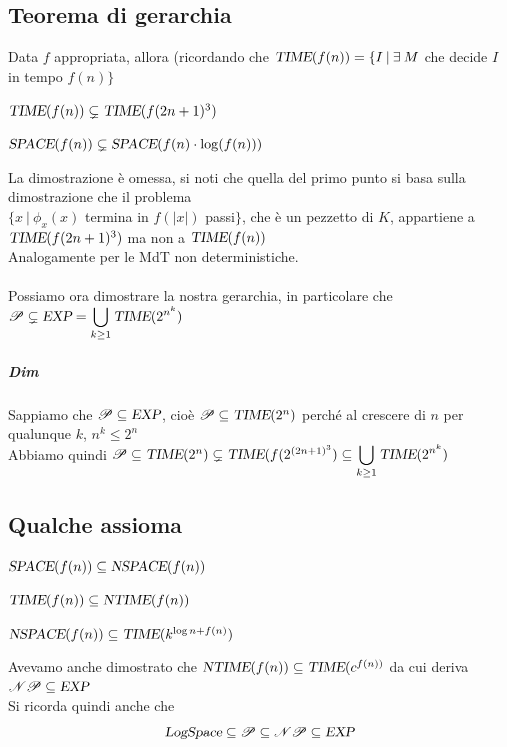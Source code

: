 \documentclass[10pt]{book}
\begin{document}
\subsection{Teorema di gerarchia}
Data $f$ appropriata, allora (ricordando che $\textsl{TIME}(f(n))=\{I\:|\:\exists\:M$ che decide $I$ in tempo $f(n)\}$
\begin{list}{}{}
	\item $\textsl{TIME}(f(n))\subsetneq\textsl{TIME}(f(2n + 1)^3)$
	\item $\textsl{SPACE}(f(n))\subsetneq\textsl{SPACE}(f(n)\cdot\log(f(n)))$
\end{list}
La dimostrazione è omessa, si noti che quella del primo punto si basa sulla dimostrazione che il problema\\$\{x\:|\:\phi_x(x)$ termina in $f(|x|)$ passi$\}$, che è un pezzetto di $K$, appartiene a $\textsl{TIME}(f(2n+1)^3)$ ma non a $\textsl{TIME}(f(n))$\\
Analogamente per le MdT non deterministiche.
\paragraph{} Possiamo ora dimostrare la nostra gerarchia, in particolare che $\mathscr{P} \subsetneq \textsl{EXP} = \mathlarger{\bigcup_{k \geq 1}\textsl{TIME}(2^{n^k})}$
\subparagraph{Dim} Sappiamo che $\mathscr{P} \subseteq \textsl{EXP}$, cioè $\mathscr{P} \subseteq \textsl{TIME}(2^n)$ perché al crescere di $n$ per qualunque $k$, $n^k \leq 2^n$\\
Abbiamo quindi $\mathscr{P} \subseteq \textsl{TIME}(2^n) \subsetneq\textsl{TIME}(f(2^{(2n + 1)^3}) \subseteq \mathlarger{\bigcup_{k \geq 1}\textsl{TIME}(2^{n^k})}$
\subsection{Qualche assioma}
\begin{list}{-}{}
	\item $\textsl{SPACE}(f(n))\subseteq\textsl{NSPACE}(f(n))$
	\item $\textsl{TIME}(f(n))\subseteq\textsl{NTIME}(f(n))$
	\item $\textsl{NSPACE}(f(n))\subseteq\textsl{TIME}(k^{\log n + f(n)})$
\end{list}
Avevamo anche dimostrato che $\textsl{NTIME}(f(n)) \subseteq \textsl{TIME}(c^{f(n))}$ da cui deriva $\mathscr{NP} \subseteq \textsl{EXP}$\\
Si ricorda quindi anche che
$$\textsl{LogSpace} \subseteq \mathscr{P} \subseteq \mathscr{NP} \subseteq \textsl{EXP}$$
\pagebreak
\end{document}
